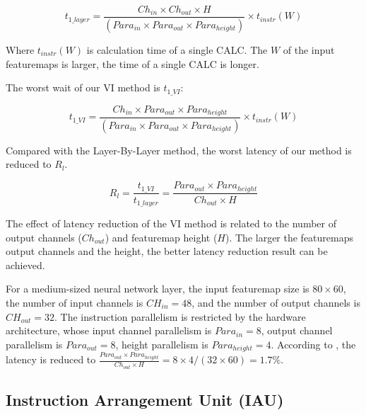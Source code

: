 \begin{equation*}
	t_{1\_layer} = \frac{ Ch_{in} \times Ch_{out} \times H }{ (Para_{in} \times Para_{out} \times Para_{height}) } \times t_{instr}(W)
\end{equation*}

Where $t_{instr}(W)$ is calculation time of a single CALC. The $W$ of the input featuremaps is larger, the time of a single CALC is longer.

The worst wait of our VI method is $t_{1\_VI}$:

\begin{equation*}
	t_{1\_VI} = \frac{ Ch_{in} \times Para_{out} \times Para_{height} }{ (Para_{in} \times Para_{out} \times Para_{height}) }  \times t_{instr}(W)
\end{equation*}

Compared with the Layer-By-Layer method, the worst latency of our method is reduced to $R_l$.

\begin{equation}
	R_l = \frac{ t_{1\_VI} }{ t_{1\_layer} }  = \frac{ Para_{out} \times Para_{height} }{ Ch_{out} \times H} 
	\label{equ:rate}
\end{equation}

The effect of latency reduction of the VI method is related to the number of output channels ($Ch_{out}$) and featuremap height ($H$). The larger the featuremaps output channels and the height, the better latency reduction result can be achieved.

For a medium-sized neural network layer, the input featuremap size is $80 \times 60$, the number of input channels is $CH_{in} = 48$, and the number of output channels is $CH_{out} = 32$. The instruction parallelism is restricted by the hardware architecture, whose input channel parallelism is $Para_{in} = 8$, output channel parallelism is $Para_{out} = 8$, height parallelism is $Para_{height} = 4$.
According to , the latency is reduced to $\frac{ Para_{out} \times Para_{height} }{ Ch_{out} \times H} = 8 \times 4 / (32 \times 60) = 1.7\%$.


\subsection{ Instruction Arrangement Unit (IAU) }

